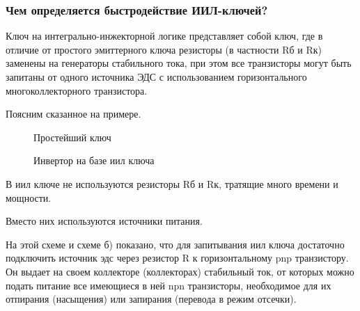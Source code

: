 \subsubsection{Чем определяется быстродействие ИИЛ-ключей?}

Ключ на интегрально-инжекторной логике представляет собой ключ, где в отличие от простого эмиттерного ключа резисторы (в частности Rб и Rк) заменены на генераторы стабильного тока, при этом все транзисторы могут быть запитаны от одного источника ЭДС с использованием горизонтального многоколлекторного транзистора.

Поясним сказанное на примере.

\begin{center}
	\begin{figure}[h!]
		\caption{Простейший ключ}	
		\label{iil1}
	\end{figure}
\end{center}

 

\begin{center}
	\begin{figure}[h!]
		\caption{Инвертор на базе иил ключа}	
		\label{iil3}
	\end{figure}
\end{center}



В иил ключе не используются резисторы Rб и Rк, тратящие много времени и мощности. 

Вместо них используются источники питания. 

\begin{center}
	\begin{figure}[h!]
		\caption{}	
		\label{iil5}
	\end{figure}
\end{center}



\begin{center}
	\begin{figure}[h!]
		\caption{}	
		\label{iil7}
	\end{figure}
\end{center}
На этой схеме и схеме б) показано, что для запитывания иил ключа достаточно подключить источник эдс через резистор R к горизонтальному pnp транзистору. Он выдает на своем коллекторе (коллекторах) стабильный ток, от которых можно подать питание все имеющиеся в ней npn транзисторы, необходимое для их отпирания (насыщения) или запирания (перевода в режим отсечки).

